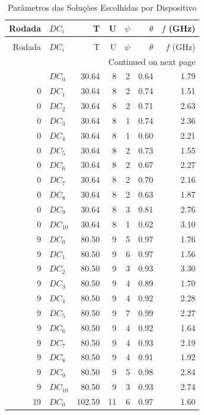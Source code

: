 \begin{longtable}{rlrrrrr}
\caption{Parâmetros das Soluções Escolhidas por Dispositivo} \label{tab:solucoes_dc} \\
\toprule
Rodada & $DC_i$ & T & U & $\psi$ & $\theta$ & $f$ (GHz) \\
\midrule
\endfirsthead
\caption[]{Parâmetros das Soluções Escolhidas por Dispositivo} \\
\toprule
Rodada & $DC_i$ & T & U & $\psi$ & $\theta$ & $f$ (GHz) \\
\midrule
\endhead
\midrule
\multicolumn{7}{r}{Continued on next page} \\
\midrule
\endfoot
\bottomrule
\endlastfoot
0 & $DC_{0}$ & 30.64 & 8 & 2 & 0.64 & 1.79 \\
0 & $DC_{1}$ & 30.64 & 8 & 2 & 0.74 & 1.51 \\
0 & $DC_{2}$ & 30.64 & 8 & 2 & 0.71 & 2.63 \\
0 & $DC_{3}$ & 30.64 & 8 & 1 & 0.74 & 2.36 \\
0 & $DC_{4}$ & 30.64 & 8 & 1 & 0.60 & 2.21 \\
0 & $DC_{5}$ & 30.64 & 8 & 2 & 0.73 & 1.55 \\
0 & $DC_{6}$ & 30.64 & 8 & 2 & 0.67 & 2.27 \\
0 & $DC_{7}$ & 30.64 & 8 & 2 & 0.70 & 2.16 \\
0 & $DC_{8}$ & 30.64 & 8 & 2 & 0.63 & 1.87 \\
0 & $DC_{9}$ & 30.64 & 8 & 3 & 0.81 & 2.76 \\
0 & $DC_{10}$ & 30.64 & 8 & 1 & 0.62 & 3.10 \\
9 & $DC_{0}$ & 80.50 & 9 & 5 & 0.97 & 1.76 \\
9 & $DC_{1}$ & 80.50 & 9 & 6 & 0.97 & 1.56 \\
9 & $DC_{2}$ & 80.50 & 9 & 3 & 0.93 & 3.30 \\
9 & $DC_{3}$ & 80.50 & 9 & 4 & 0.89 & 1.70 \\
9 & $DC_{4}$ & 80.50 & 9 & 4 & 0.92 & 2.28 \\
9 & $DC_{5}$ & 80.50 & 9 & 7 & 0.99 & 2.27 \\
9 & $DC_{6}$ & 80.50 & 9 & 4 & 0.92 & 1.64 \\
9 & $DC_{7}$ & 80.50 & 9 & 4 & 0.93 & 2.19 \\
9 & $DC_{8}$ & 80.50 & 9 & 4 & 0.91 & 1.92 \\
9 & $DC_{9}$ & 80.50 & 9 & 5 & 0.98 & 2.84 \\
9 & $DC_{10}$ & 80.50 & 9 & 3 & 0.93 & 2.74 \\
19 & $DC_{0}$ & 102.59 & 11 & 6 & 0.97 & 1.60 \\

\end{longtable}
